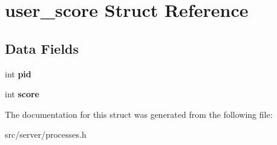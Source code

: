 \hypertarget{structuser__score}{}\section{user\+\_\+score Struct Reference}
\label{structuser__score}
\subsection*{Data Fields}
\begin{DoxyCompactItemize}
\item 
\mbox{\label{structuser__score_a7661b7ca2eb7c591a38b1f002c002814}} 
int {\bfseries pid}
\item 
\mbox{\label{structuser__score_acd93ddcb7f65b702a4a80f28ade5049e}} 
int {\bfseries score}
\end{DoxyCompactItemize}


The documentation for this struct was generated from the following file\+:\begin{DoxyCompactItemize}
\item 
src/server/processes.\+h\end{DoxyCompactItemize}
